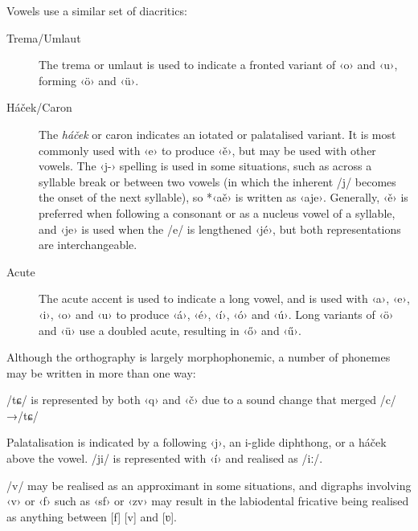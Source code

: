 \documentclass[grammar]{subfiles}
\begin{document}
  \pagebreak[2]
  Vowels use a similar set of diacritics:

  \begin{description}
    \item[Trema/Umlaut] The trema or umlaut is used to indicate a fronted variant of ‹o› and ‹u›, forming ‹ö› and ‹ü›.
    \item[Háček/Caron]\label{def:hacek} The \emph{háček} or caron indicates an iotated or palatalised variant. It is most commonly used with ‹e› to produce ‹ě›, but may be used with other vowels. The ‹j-› spelling is used in some situations, such as across a syllable break or between two vowels (in which the inherent /j/ becomes the onset of the next syllable), so *‹aě› is written as ‹aje›. Generally, ‹ě› is preferred when following a consonant or as a nucleus vowel of a syllable, and ‹je› is used when the /e/ is lengthened ‹jé›, but both representations are interchangeable.
    \item[Acute] The acute accent is used to indicate a long vowel, and is used with ‹a›, ‹e›, ‹i›, ‹o› and ‹u› to produce ‹á›, ‹é›, ‹í›, ‹ó› and ‹ú›. Long variants of ‹ö› and ‹ü› use a doubled acute, resulting in ‹ő› and ‹ű›. 
  \end{description}

  Although the orthography is largely morphophonemic, a number of phonemes may be written in more than one way:

  \begin{itemize*}
  \item	/tɕ/ is represented by both ‹q› and ‹č› due to a sound change that merged /c/→/tɕ/
  \item Palatalisation is indicated by a following ‹j›, an i-glide diphthong, or a háček above the vowel. /ji/ is represented with ‹í› and realised as /\superj iː/.
  \item /v/ may be realised as an approximant in some situations, and digraphs involving ‹v› or ‹f› such as ‹sf› or ‹zv› may result in the labiodental fricative being realised as anything between [f] [v] and [ʋ].
  \end{itemize*}
\end{document}
